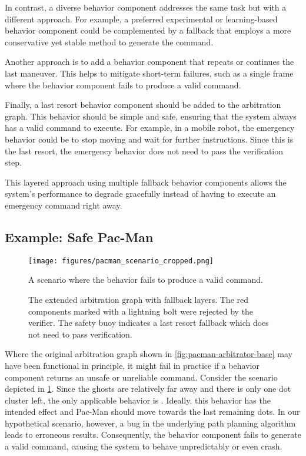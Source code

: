 In contrast, a diverse behavior component addresses the same task but with a different approach.
For example, a preferred experimental or learning-based behavior component could be complemented by a fallback that employs a more conservative yet stable method to generate the command.

Another approach is to add a behavior component that repeats or continues the last maneuver.
This helps to mitigate short-term failures, such as a single frame where the behavior component fails to produce a valid command.

Finally, a last resort behavior component should be added to the arbitration graph.
This behavior should be simple and safe, ensuring that the system always has a valid command to execute.
For example, in a mobile robot, the emergency behavior could be to stop moving and wait for further instructions.
Since this is the last resort, the emergency behavior does not need to pass the verification step.

This layered approach using multiple fallback behavior components allows the system's performance to degrade gracefully instead of having to execute an emergency command right away.

\subsection{Example: Safe Pac-Man}

\begin{figure}
    \centering
    \texttt{[image: figures/pacman\_scenario\_cropped.png]}
    \caption{A scenario where the  behavior fails to produce a valid command.}
    \label{fig:pacman-scenario}
\end{figure}

\begin{figure}
    \centering
    
    \caption{The extended arbitration graph with fallback layers.
        The red components marked with a lightning bolt were rejected by the verifier.
        The safety buoy indicates a last resort fallback which does not need to pass verification.}
    \label{fig:pacman-arbitrator-safe}
\end{figure}

Where the original arbitration graph shown in \cref{fig:pacman-arbitrator-base} may have been functional in principle, it might fail in practice if a behavior component returns an unsafe or unreliable command.
Consider the scenario depicted in \cref{fig:pacman-scenario}.
Since the ghosts are relatively far away and there is only one dot cluster left, the only applicable behavior is .
Ideally, this behavior has the intended effect and Pac-Man should move towards the last remaining dots.
In our hypothetical scenario, however, a bug in the underlying path planning algorithm leads to erroneous results.
Consequently, the behavior component fails to generate a valid command, causing the system to behave unpredictably or even crash.

